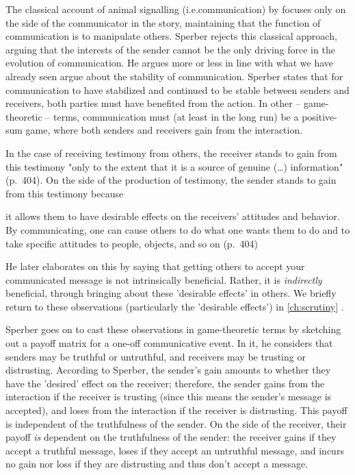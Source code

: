 The classical account of animal signalling (i.e.\@ communication) by \citet{DawkinsKrebs78} focuses only on the side of the communicator in the story, maintaining that the function of communication is to manipulate others. Sperber rejects this classical approach, arguing that the interests of the sender cannot be the only driving force in the evolution of communication.
He argues more or less in line with what we have already seen \citet{Scott-Phillips08} argue about the stability of communication.
Sperber states that for communication to have stabilized and continued to be stable between senders and receivers, both parties must have benefited from the action. In other -- game-theoretic -- terms, communication must (at least in the long run) be a positive-sum game, where both senders and receivers gain from the interaction.

In the case of receiving testimony from others, the receiver stands to gain from this testimony "only to the extent that it is a source of genuine (\ldots) information" (p.~404).
On the side of the production of testimony, the sender stands to gain from this testimony because
\begin{quoting}
    it allows them to have desirable effects on the receivers' attitudes and behavior. By communicating, one can cause others to do what one wants them to do and to take specific attitudes to people, objects, and so on
    \hfill (p.~404)
\end{quoting}
He later elaborates on this by saying that getting others to accept your communicated message is not intrinsically beneficial. Rather, it is \emph{indirectly} beneficial, through bringing about these 'desirable effects' in others.
We briefly return to these observations (particularly the 'desirable effects') in \cref{ch:scrutiny} .

Sperber goes on to cast these observations in game-theoretic terms by sketching out a payoff matrix for a one-off communicative event. In it, he considers that senders may be truthful or untruthful, and receivers may be trusting or distrusting. According to Sperber, the sender's gain amounts to whether they have the 'desired' effect on the receiver; therefore, the sender gains from the interaction if the receiver is trusting (since this means the sender's message is accepted), and loses from the interaction if the receiver is distrusting. This payoff is independent of the truthfulness of the sender. On the side of the receiver, their payoff \emph{is} dependent on the truthfulness of the sender: the receiver gains if they accept a truthful message, loses if they accept an untruthful message, and incurs no gain nor loss if they are distrusting and thus don't accept a message.

